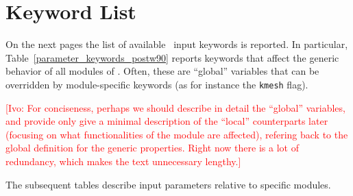 \section{Keyword List}
On the next pages the list of available
\postw\ input keywords is reported.
In particular, Table~\ref{parameter_keywords_postw90} reports keywords
that affect the generic behavior of all modules of
\postw. Often, these are ``global'' variables that can be overridden
by module-specific keywords (as for instance the {\tt kmesh} flag).

\textcolor{red}{[Ivo: For conciseness, perhaps we should describe in
  detail the ``global'' variables, and provide only give a minimal
  description of the ``local'' counterparts later (focusing on what
  functionalities of the module are affected), refering back to the
  global definition for the generic properties. Right now there is a
  lot of redundancy, which makes the text unnecessary lengthy.]}

The subsequent tables describe input parameters relative to specific modules.

\clearpage

